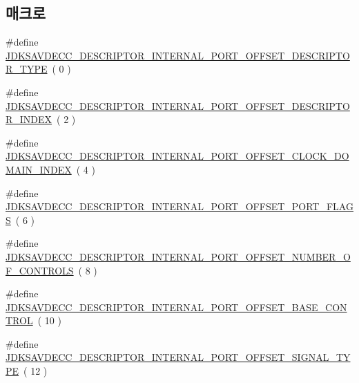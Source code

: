 \subsection*{매크로}
\begin{DoxyCompactItemize}
\item 
\#define \hyperlink{group__descriptor__internal__port_ga013a10862babe01fe83ef51be6d57c65}{J\+D\+K\+S\+A\+V\+D\+E\+C\+C\+\_\+\+D\+E\+S\+C\+R\+I\+P\+T\+O\+R\+\_\+\+I\+N\+T\+E\+R\+N\+A\+L\+\_\+\+P\+O\+R\+T\+\_\+\+O\+F\+F\+S\+E\+T\+\_\+\+D\+E\+S\+C\+R\+I\+P\+T\+O\+R\+\_\+\+T\+Y\+PE}~( 0 )
\item 
\#define \hyperlink{group__descriptor__internal__port_gac942d8ca7901c0cf560cf259d2900fdf}{J\+D\+K\+S\+A\+V\+D\+E\+C\+C\+\_\+\+D\+E\+S\+C\+R\+I\+P\+T\+O\+R\+\_\+\+I\+N\+T\+E\+R\+N\+A\+L\+\_\+\+P\+O\+R\+T\+\_\+\+O\+F\+F\+S\+E\+T\+\_\+\+D\+E\+S\+C\+R\+I\+P\+T\+O\+R\+\_\+\+I\+N\+D\+EX}~( 2 )
\item 
\#define \hyperlink{group__descriptor__internal__port_gad5dcf305ef3caee9b76f6c8c86fbf32b}{J\+D\+K\+S\+A\+V\+D\+E\+C\+C\+\_\+\+D\+E\+S\+C\+R\+I\+P\+T\+O\+R\+\_\+\+I\+N\+T\+E\+R\+N\+A\+L\+\_\+\+P\+O\+R\+T\+\_\+\+O\+F\+F\+S\+E\+T\+\_\+\+C\+L\+O\+C\+K\+\_\+\+D\+O\+M\+A\+I\+N\+\_\+\+I\+N\+D\+EX}~( 4 )
\item 
\#define \hyperlink{group__descriptor__internal__port_gada4b431eefd8590dcacc9f25de70c371}{J\+D\+K\+S\+A\+V\+D\+E\+C\+C\+\_\+\+D\+E\+S\+C\+R\+I\+P\+T\+O\+R\+\_\+\+I\+N\+T\+E\+R\+N\+A\+L\+\_\+\+P\+O\+R\+T\+\_\+\+O\+F\+F\+S\+E\+T\+\_\+\+P\+O\+R\+T\+\_\+\+F\+L\+A\+GS}~( 6 )
\item 
\#define \hyperlink{group__descriptor__internal__port_ga3657e336ea5c9d5da9d4a2c49db92c8f}{J\+D\+K\+S\+A\+V\+D\+E\+C\+C\+\_\+\+D\+E\+S\+C\+R\+I\+P\+T\+O\+R\+\_\+\+I\+N\+T\+E\+R\+N\+A\+L\+\_\+\+P\+O\+R\+T\+\_\+\+O\+F\+F\+S\+E\+T\+\_\+\+N\+U\+M\+B\+E\+R\+\_\+\+O\+F\+\_\+\+C\+O\+N\+T\+R\+O\+LS}~( 8 )
\item 
\#define \hyperlink{group__descriptor__internal__port_ga833e549c8870731a9bf9614b0da8d8de}{J\+D\+K\+S\+A\+V\+D\+E\+C\+C\+\_\+\+D\+E\+S\+C\+R\+I\+P\+T\+O\+R\+\_\+\+I\+N\+T\+E\+R\+N\+A\+L\+\_\+\+P\+O\+R\+T\+\_\+\+O\+F\+F\+S\+E\+T\+\_\+\+B\+A\+S\+E\+\_\+\+C\+O\+N\+T\+R\+OL}~( 10 )
\item 
\#define \hyperlink{group__descriptor__internal__port_ga10de7cc55655e1da089e1fd6781a15ab}{J\+D\+K\+S\+A\+V\+D\+E\+C\+C\+\_\+\+D\+E\+S\+C\+R\+I\+P\+T\+O\+R\+\_\+\+I\+N\+T\+E\+R\+N\+A\+L\+\_\+\+P\+O\+R\+T\+\_\+\+O\+F\+F\+S\+E\+T\+\_\+\+S\+I\+G\+N\+A\+L\+\_\+\+T\+Y\+PE}~( 12 )
\item 

\end{DoxyCompactItemize}
